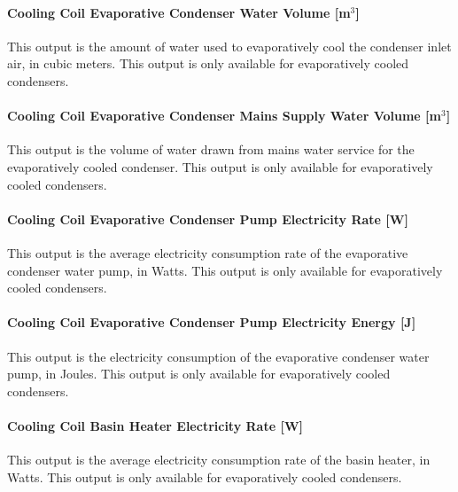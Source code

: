\paragraph{Cooling Coil Evaporative Condenser Water Volume {[}m\(^{3}\){]}}\label{cooling-coil-evaporative-condenser-water-volume-m3-2}

This output is the amount of water used to evaporatively cool the condenser inlet air, in cubic meters. This output is only available for evaporatively cooled condensers.

\paragraph{Cooling Coil Evaporative Condenser Mains Supply Water Volume {[}m\(^{3}\){]}}\label{cooling-coil-evaporative-condenser-mains-supply-water-volume-m3-2}

This output is the volume of water drawn from mains water service for the evaporatively cooled condenser. This output is only available for evaporatively cooled condensers.

\paragraph{Cooling Coil Evaporative Condenser Pump Electricity Rate {[}W{]}}\label{cooling-coil-evaporative-condenser-pump-electric-power-w-1}

This output is the average electricity consumption rate of the evaporative condenser water pump, in Watts. This output is only available for evaporatively cooled condensers.

\paragraph{Cooling Coil Evaporative Condenser Pump Electricity Energy {[}J{]}}\label{cooling-coil-evaporative-condenser-pump-electric-energy-j-2}

This output is the electricity consumption of the evaporative condenser water pump, in Joules. This output is only available for evaporatively cooled condensers.

\paragraph{Cooling Coil Basin Heater Electricity Rate {[}W{]}}\label{cooling-coil-basin-heater-electric-power-w-2}

This output is the average electricity consumption rate of the basin heater, in Watts. This output is only available for evaporatively cooled condensers.

